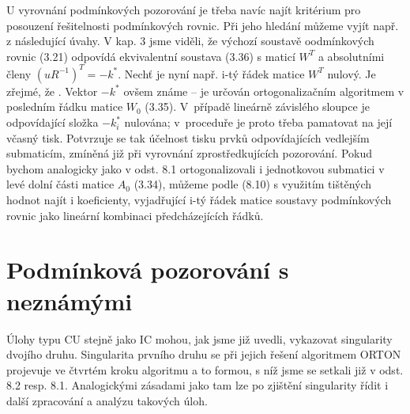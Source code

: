 U vyrovnání podmínkových pozorování je třeba navíc najít kritérium pro
posouzení řešitelnosti podmínkových rovnic. Při jeho hledání můžeme
vyjít např. z následující úvahy. V kap. 3 jsme viděli, že výchozí
soustavě oodmínkových rovnic (3.21) odpovídá ekvivalentní soustava
(3.36) s maticí $W^T$ a absolutními členy $(u R^{-1})^T = -k^{*}$.
Nechť je nyní např. i-tý řádek matice $W^T$ nulový.  Je zřejmé, že
.
%
Vektor $-k^*$ ovšem známe -- je
%
 určován ortogonalizačním algoritmem v posledním řádku matice
$W_0$ (3.35). V~případě lineárně závislého sloupce je
odpovídající složka $-k_i^*$ nulována;
v~proceduře je proto třeba pamatovat
na její včasný tisk. Potvrzuje se tak účelnost tisku prvků
odpovídajících vedlejším submaticím, zmíněná již při vyrovnání
zprostředkujících pozorování. Pokud bychom analogicky jako v
odst. 8.1 ortogonalizovali i jednotkovou submatici v levé
dolní části matice $A_0$ (3.34), můžeme podle (8.10) s využitím
tištěných hodnot najít i koeficienty, vyjadřující i-tý řádek
matice soustavy podmínkových rovnic jako lineární kombinaci
předcházejících řádků.



\section{Podmínková pozorování s neznámými}

Úlohy typu CU stejně jako IC mohou, jak jsme již uvedli,
vykazovat singularity dvojího druhu. Singularita prvního druhu se
při jejich řešení algoritmem ORTON projevuje ve čtvrtém kroku
algoritmu a to formou, s níž jsme se setkali již v odst. 8.2
resp. 8.1. Analogickými zásadami jako tam lze po zjištění
singularity řídit i další zpracování a analýzu takových úloh.


